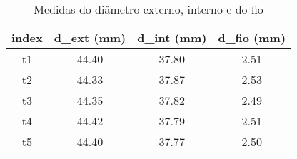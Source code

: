 \begin{table}
\caption{Medidas do diâmetro externo, interno e do fio}
\label{tab:medidas}
\begin{tabular}{c|c|c|c}
\toprule
 index & d_ext (mm) & d_int (mm) & d_fio (mm) \\
\midrule
t1 & 44.40 & 37.80 & 2.51 \\
t2 & 44.33 & 37.87 & 2.53 \\
t3 & 44.35 & 37.82 & 2.49 \\
t4 & 44.42 & 37.79 & 2.51 \\
t5 & 44.40 & 37.77 & 2.50 \\
\bottomrule
\end{tabular}
\end{table}
